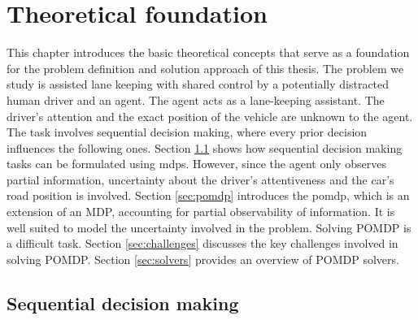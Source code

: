 \chapter{Theoretical foundation}
\label{ch:theory}


This chapter introduces the basic theoretical concepts that serve as a foundation for the problem definition and solution approach of this thesis. The problem we study is assisted lane keeping with shared control by a potentially distracted human driver and an agent. The agent acts as a lane-keeping assistant. The driver's attention and the exact position of the vehicle are unknown to the agent. The task involves sequential decision making, where every prior decision influences the following ones. Section \ref{sec:mdp} shows how sequential decision making tasks can be formulated using \Glspl{mdp}. However, since the agent only observes partial information, uncertainty about the driver's attentiveness and the car's road position is involved. Section \ref{sec:pomdp} introduces the \Gls{pomdp}, which is an extension of an MDP, accounting for partial observability of information. It is well suited to model the uncertainty involved in the problem. Solving POMDP is a difficult task. Section \ref{sec:challenges} discusses the key challenges involved in solving POMDP. Section \ref{sec:solvers} provides an overview of POMDP solvers.

\section{Sequential decision making}
\label{sec:mdp}


